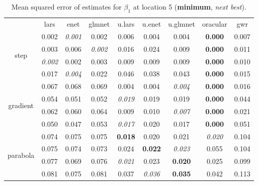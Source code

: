 \documentclass[authoryear, review, 11pt]{elsarticle}
\begin{document}
		\begin{table}[ht]
		\begin{center}
		\begin{tabular}{ccccccccc}
		  & lars & enet & glmnet & u.lars & u.enet & u.glmnet & oracular & gwr \\ 
		  \cline{2-9}
		  \multirow{4}{*}{step} & 0.002 & \emph{0.001} & 0.002 & 0.006 & 0.004 & 0.004 & \textbf{0.000} & 0.007 \\ 
		  & 0.003 & 0.006 & \emph{0.002} & 0.016 & 0.024 & 0.009 & \textbf{0.000} & 0.011 \\ 
		  & \emph{0.002} & 0.002 & 0.003 & 0.009 & 0.009 & 0.009 & \textbf{0.000} & 0.010 \\ 
		  & 0.017 & \emph{0.004} & 0.022 & 0.046 & 0.038 & 0.043 & \textbf{0.000} & 0.015 \\ 
		  \cline{2-9}
		  \multirow{4}{*}{gradient} & 0.067 & 0.068 & 0.069 & 0.004 & 0.004 & \emph{0.004} & \textbf{0.000} & 0.016 \\ 
		  & 0.054 & 0.051 & 0.052 & \emph{0.019} & 0.019 & 0.019 & \textbf{0.000} & 0.044 \\ 
		  & 0.062 & 0.060 & 0.064 & 0.009 & 0.010 & \emph{0.007} & \textbf{0.000} & 0.021 \\ 
		  & 0.050 & 0.047 & 0.053 & \emph{0.017} & 0.020 & 0.017 & \textbf{0.000} & 0.051 \\ 
		  \cline{2-9}
		  \multirow{4}{*}{parabola} & 0.074 & 0.075 & 0.075 & \textbf{0.018} & 0.020 & 0.021 & \emph{0.020} & 0.104 \\ 
		  & 0.075 & 0.074 & 0.073 & 0.024 & \textbf{0.022} & \emph{0.023} & 0.055 & 0.104 \\ 
		  & 0.077 & 0.069 & 0.076 & \emph{0.021} & 0.023 & \textbf{0.020} & 0.025 & 0.099 \\ 
		  & 0.081 & 0.075 & 0.081 & 0.037 & \emph{0.036} & \textbf{0.035} & 0.042 & 0.113 \\ 
		  \end{tabular}
		\caption{Mean squared error of estimates for $\beta_1$ at location 5 (\textbf{minimum}, \emph{next best}).\label{table:loc5-X1-MSEX}}
		\end{center}
		\end{table}
\end{document}
